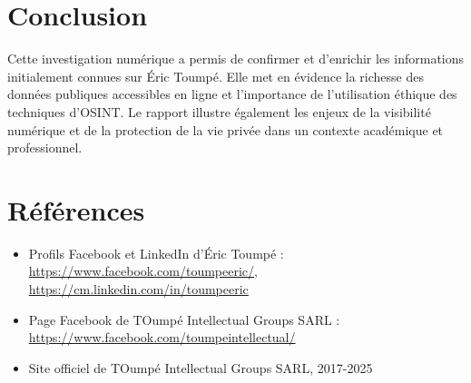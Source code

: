 \documentclass[memoire, 12pt]{report}
\begin{document}
\chapter{Conclusion}
Cette investigation numérique a permis de confirmer et d’enrichir les informations initialement connues sur Éric Toumpé.  
Elle met en évidence la richesse des données publiques accessibles en ligne et l’importance de l’utilisation éthique des techniques d’OSINT.  
Le rapport illustre également les enjeux de la visibilité numérique et de la protection de la vie privée dans un contexte académique et professionnel.

\chapter*{Références}
\begin{itemize}
    \item Profils Facebook et LinkedIn d'Éric Toumpé : \url{https://www.facebook.com/toumpeeric/}, \url{https://cm.linkedin.com/in/toumpeeric}
    \item Page Facebook de TOumpé Intellectual Groups SARL : \url{https://www.facebook.com/toumpeintellectual/}
    \item Site officiel de TOumpé Intellectual Groups SARL, 2017-2025
\end{itemize}
\end{document}

